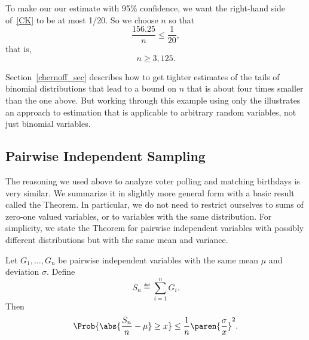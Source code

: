 To make our our estimate with 95\% confidence, we want the right-hand
side of~\eqref{CK} to be at most 1/20.  So we choose $n$ so that
\[
\frac{156.25}{n} \leq \frac{1}{20},
\]
that is,
\[
n \geq 3,125.
\]

Section~\ref{chernoff_sec} describes how to get tighter estimates of
the tails of binomial distributions that lead to a bound on $n$ that
is about four times smaller than the one above.  But working through
this example using only the  illustrates an approach to
estimation that is applicable to arbitrary random variables, not just
binomial variables.  \iffalse , and it did lead to a feasible, though
larger than necessary, sample size.\fi

\subsection{Pairwise Independent Sampling}

The reasoning we used above to analyze voter polling and matching
birthdays is very similar.  We summarize it in slightly more general form
with a basic result called the 
Theorem.  In particular, we do not need to restrict ourselves to sums of
zero-one valued variables, or to variables with the same distribution.
For simplicity, we state the Theorem for pairwise independent variables
with possibly different distributions but with the same mean and variance.

\begin{theorem}\label{th:pairwise-sampling}
Let $G_1, \dots, G_n$ be pairwise independent variables with the same
mean $\mu$ and deviation $\sigma$.  Define
\begin{equation}\label{ln14.Sn}
S_n \eqdef \sum_{i=1}^n G_i.
\end{equation}
Then
\[
\Prob{\abs{\frac{S_n}{n} - \mu} \geq x}
    \leq \frac{1}{n} \paren{\frac{\sigma}{x}}^2.
\]
\end{theorem}


